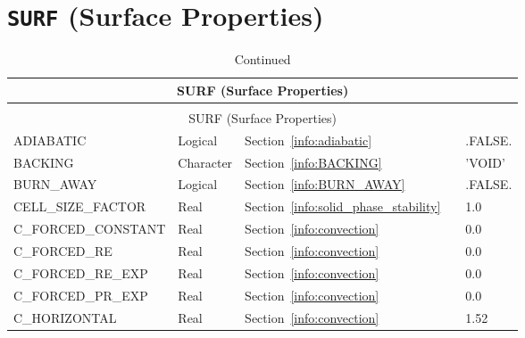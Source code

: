 \documentclass[11pt]{book}
\begin{document}
\section{\texorpdfstring{{\tt SURF}}{SURF} (Surface Properties)}

\begin{longtable}{@{\extracolsep{\fill}}|l|l|l|l|l|}
\caption[Surface properties ({\ct SURF} namelist group)]{For more information see Section~\ref{info:SURF}.}
\label{tbl:SURF} \\
\hline
\multicolumn{5}{|c|}{{\ct SURF} (Surface Properties)} \\
\hline \hline
\endfirsthead
\caption[]{Continued} \\
\hline
\multicolumn{5}{|c|}{{\ct SURF} (Surface Properties)} \\
\hline \hline
\endhead
{\ct ADIABATIC}                       & Logical         & Section~\ref{info:adiabatic}              &                     & {\ct .FALSE.}           \\ \hline
{\ct BACKING}                         & Character       & Section~\ref{info:BACKING}                &                     & {\ct 'VOID'}            \\ \hline
{\ct BURN\_AWAY}                      & Logical         & Section~\ref{info:BURN_AWAY}              &                     & {\ct .FALSE.}           \\ \hline
{\ct CELL\_SIZE\_FACTOR}              & Real            & Section~\ref{info:solid_phase_stability}  &                     & 1.0                     \\ \hline
{\ct C\_FORCED\_CONSTANT}             & Real            & Section~\ref{info:convection}             &                     & 0.0                     \\ \hline
{\ct C\_FORCED\_RE}                   & Real            & Section~\ref{info:convection}             &                     & 0.0                     \\ \hline
{\ct C\_FORCED\_RE\_EXP}              & Real            & Section~\ref{info:convection}             &                     & 0.0                     \\ \hline
{\ct C\_FORCED\_PR\_EXP}              & Real            & Section~\ref{info:convection}             &                     & 0.0                     \\ \hline
{\ct C\_HORIZONTAL}                   & Real            & Section~\ref{info:convection}             &                     & 1.52                    \\ \hline

\end{longtable}
\end{document}
